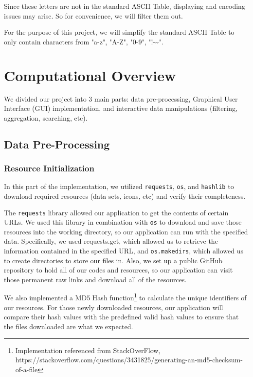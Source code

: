\documentclass[fontsize=11pt]{article}
\begin{document}
    Since these letters are not in the standard ASCII Table, displaying and encoding issues may arise. So for convenience, we will filter them out.

    For the purpose of this project, we will simplify the standard ASCII Table to only contain characters from "a-z", "A-Z", "0-9", "!-\~{}".

    \newpage

    \section{Computational Overview}

    We divided our project into 3 main parts: data pre-processing, Graphical User Interface (GUI) implementation, and interactive data manipulations (filtering, aggregation, searching, etc).

    \subsection{Data Pre-Processing}

    \subsubsection{Resource Initialization}

    In this part of the implementation, we utilized \verb|requests|, \verb|os|, and \verb|hashlib| to download required resources (data sets, icons, etc) and verify their completeness.

    The \verb|requests| library allowed our application to get the contents of certain URLs. We used this library in combination with \verb|os| to download and save those resources into the working directory, so our application can run with the specified data. Specifically, we used requests.get, which allowed us to retrieve the information contained in the specified URL, and \verb|os.makedirs|, which allowed us to create directories to store our files in. Also, we set up a public GitHub repository to hold all of our codes and resources, so our application can visit those permanent raw links and download all of the resources.

    We also implemented a MD5 Hash function\footnote{Implementation referenced from StackOverFlow, https://stackoverflow.com/questions/3431825/generating-an-md5-checksum-of-a-file} to calculate the unique identifiers of our resources. For those newly downloaded resources, our application will compare their hash values with the predefined valid hash values to ensure that the files downloaded are what we expected.
\end{document}
